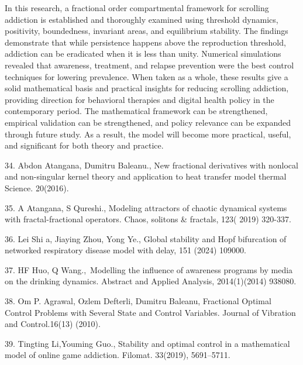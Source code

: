\documentclass[10pt]{NSP1}
\begin{document}
\par\medskip{}\smallskip

In this research, a fractional order compartmental framework for scrolling addiction is established and thoroughly examined using threshold dynamics, positivity, boundedness, invariant areas, and equilibrium stability. The findings demonstrate that while persistence happens above the reproduction threshold, addiction can be eradicated when it is less than unity. Numerical simulations revealed that awareness, treatment, and relapse prevention were the best control techniques for lowering prevalence. When taken as a whole, these results give a solid mathematical basis and practical insights for reducing scrolling addiction, providing direction for behavioral therapies and digital health policy in the contemporary period. The mathematical framework can be strengthened, empirical validation can be strengthened, and policy relevance can be expanded through future study. As a result, the model will become more practical, useful, and significant for both theory and practice.

\par\medskip{}\smallskip

34. Abdon Atangana, Dumitru Baleanu., New fractional derivatives with nonlocal and non-singular kernel theory and application to heat transfer model thermal Science. 20(2016).

35. A Atangana, S Qureshi., Modeling attractors of chaotic dynamical systems with fractal-fractional operators. Chaos, solitons \& fractals, 123( 2019) 320-337.

36. Lei Shi a, Jiaying Zhou, Yong Ye., Global stability and Hopf bifurcation of networked respiratory disease model with delay, 151 (2024) 109000.

37. HF Huo, Q Wang., Modelling the inﬂuence of awareness programs by media on the drinking dynamics. Abstract and Applied Analysis, 2014(1)(2014) 938080.

38. Om P. Agrawal, Ozlem Defterli, Dumitru Baleanu, Fractional Optimal Control Problems with Several State and Control Variables. Journal of Vibration and Control.16(13) (2010).

39. Tingting Li,Youming Guo., Stability and optimal control in a mathematical model of online game addiction. Filomat. 33(2019), 5691–5711.
\end{document}
